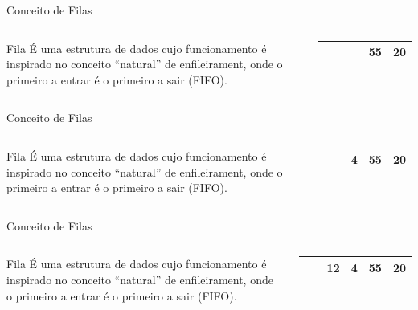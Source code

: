 \documentclass[12pt,table,xcolor={dvipsnames}]{beamer}
\begin{document}
\begin{frame}{Conceito de Filas}
\begin{columns}
\begin{block}{Fila}
É uma estrutura de dados cujo funcionamento é inspirado no conceito “natural” de enfileirament, onde o primeiro a entrar é o primeiro a sair (FIFO).
\end{block}
\begin{center}
{
\begin{tabular}{ |p{.5cm}|p{.5cm}|p{.5cm}|p{.5cm}|p{.5cm}|p{.5cm}| }
\hline
 &  &  &  & 55 & 20 \\ \hline
\end{tabular}
}
\end{center}
\end{columns}
\end{frame}

\begin{frame}{Conceito de Filas}
\begin{columns}
\begin{block}{Fila}
É uma estrutura de dados cujo funcionamento é inspirado no conceito “natural” de enfileirament, onde o primeiro a entrar é o primeiro a sair (FIFO).
\end{block}
\begin{center}
{
\begin{tabular}{ |p{.5cm}|p{.5cm}|p{.5cm}|p{.5cm}|p{.5cm}|p{.5cm}| }
\hline
 &  &  & 4 & 55 & 20 \\ \hline
\end{tabular}
}
\end{center}
\end{columns}
\end{frame}

\begin{frame}{Conceito de Filas}
\begin{columns}
\begin{block}{Fila}
É uma estrutura de dados cujo funcionamento é inspirado no conceito “natural” de enfileirament, onde o primeiro a entrar é o primeiro a sair (FIFO).
\end{block}
\begin{center}
{
\begin{tabular}{ |p{.5cm}|p{.5cm}|p{.5cm}|p{.5cm}|p{.5cm}|p{.5cm}| }
\hline
 &  & 12 & 4 & 55 & 20 \\ \hline
\end{tabular}
}
\end{center}
\end{columns}
\end{frame}
\end{document}
